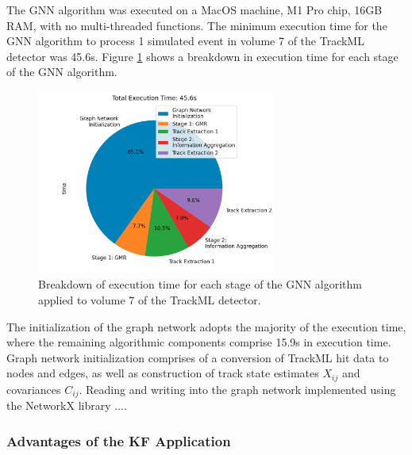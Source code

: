 The GNN algorithm was executed on a MacOS machine, M1 Pro chip, 16GB RAM, with no multi-threaded functions. The minimum execution time for the GNN algorithm to process 1 simulated event in volume 7 of the TrackML detector was 45.6s. Figure \ref{fig:execution-time-endcap-1} shows a breakdown in execution time for each stage of the GNN algorithm.

\begin{figure}[htbp]
    \centering
    \includegraphics[width=0.7\textwidth]{images/7-results/execution-time-endcap-1.png}
    \caption{Breakdown of execution time for each stage of the GNN algorithm applied to volume 7 of the TrackML detector.}
    \label{fig:execution-time-endcap-1}%
\end{figure}


The initialization of the graph network adopts the majority of the execution time, where the remaining algorithmic components comprise 15.9s in execution time. Graph network initialization comprises of a conversion of TrackML hit data to nodes and edges, as well as construction of track state estimates $X_{ij}$ and covariances $C_{ij}$. Reading and writing into the graph network implemented using the NetworkX library ....







\subsubsection{Advantages of the KF Application}

